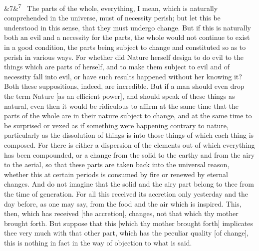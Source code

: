 \documentclass[12pt]{article}
\newcommand{\para}[1][]{\par\noindent\ifx&#1&\else\textsuperscript{\footnotesize #1}~\fi}
\begin{document}
\para[7] The parts of the whole, everything, I mean, which is naturally
comprehended in the universe, must of necessity perish; but let this be
understood in this sense, that they must undergo change. But if this is
naturally both an evil and a necessity for the parts, the whole would
not continue to exist in a good condition, the parts being subject to
change and constituted so as to perish in various ways. For whether did
Nature herself design to do evil to the things which are parts of
herself, and to make them subject to evil and of necessity fall into
evil, or have such results happened without her knowing it? Both these
suppositions, indeed, are incredible. But if a man should even drop the
term Nature [as an efficient power], and should speak of these things as
natural, even then it would be ridiculous to affirm at the same time
that the parts of the whole are in their nature subject to change, and
at the same time to be surprised or vexed as if something were happening
contrary to nature, particularly as the dissolution of things is into
those things of which each thing is composed. For there is either a
dispersion of the elements out of which everything has been compounded,
or a change from the solid to the earthy and from the airy to the
aerial, so that these parts are taken back into the universal reason,
whether this at certain periods is consumed by fire or renewed by
eternal changes. And do not imagine that the solid and the airy part
belong to thee from the time of generation. For all this received its
accretion only yesterday and the day before, as one may say, from the
food and the air which is inspired. This, then, which has received [the
accretion], changes, not that which thy mother brought forth. But
suppose that this [which thy mother brought forth] implicates thee very
much with that other part, which has the peculiar quality [of change],
this is nothing in fact in the way of objection to what is said.
\end{document}
